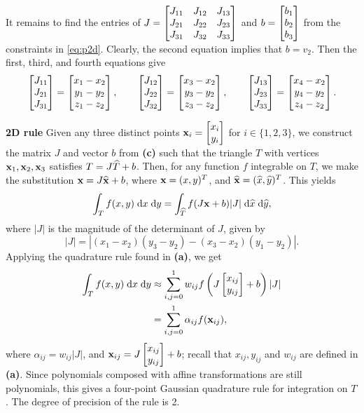 \documentclass{homework}
\begin{document}
\begin{alphaparts}
		It remains to find the entries of $J = \left[\begin{matrix}J_{11} & J_{12} & J_{13} \\ J_{21} & J_{22} & J_{23} \\ J_{31} & J_{32} & J_{33}\end{matrix}\right]$ and $b = \left[\begin{matrix}b_1 \\ b_2 \\ b_3\end{matrix}\right]$ from the constraints in \eqref{eq:p2d}. Clearly, the second equation implies that $b = v_2$. Then the first, third, and fourth equations give
		\begin{equation*}
			\left[\begin{matrix}J_{11} \\ J_{21} \\ J_{31}\end{matrix}\right] = \left[\begin{matrix}x_1 - x_2 \\ y_1-y_2 \\ z_1 - z_2\end{matrix}\right], \qquad \left[\begin{matrix}J_{12} \\ J_{22} \\ J_{32}\end{matrix}\right] = \left[\begin{matrix}x_3 - x_2 \\ y_3 - y_2 \\ z_3 - z_2\end{matrix}\right], \qquad \left[\begin{matrix}J_{13} \\ J_{23} \\ J_{33}\end{matrix}\right] = \left[\begin{matrix}x_4 - x_2 \\ y_4 - y_2 \\ z_4-z_2\end{matrix}\right].
		\end{equation*}
		
		\newcommand{\zh}{\widehat{z}}
		\newcommand{\yb}{\mathbf{y}}
		\questionpart \textbf{2D rule}\; Given any three distinct points $\mathbf{x}_i=\left[\begin{matrix}x_i\\y_i\end{matrix}\right]$ for $i\in\{1,2,3\}$, we construct the matrix $J$ and vector $b$ from \textbf{(c)} such that the triangle $T$ with vertices $\mathbf{x}_1,\mathbf{x}_2,\mathbf{x}_3$ satisfies $T = J\widehat{T} + b$. Then, for any function $f$ integrable on $T$, we make the substitution $\mathbf{x} = J\widehat{\mathbf{x}} +b$, where $\mathbf{x} = (x,y)^T$, and $\widehat{\mathbf{x}} =(\widehat{x}, \widehat{y})^T$. This yields
		\begin{equation*}
			\int_T f(x,y)\;\text{d} x\;\text{d} y = \int_{\widehat{T}}f(J\mathbf{x}+b)|J|\;\text{d} \widehat{x}\;\text{d}\widehat{y},
		\end{equation*}
		where $|J|$ is the magnitude of the determinant of $J$, given by
		\begin{equation*}
			|J| = |(x_1-x_2)(y_3-y_2) - (x_3-x_2)(y_1-y_2)|.
		\end{equation*}
		Applying the quadrature rule found in \textbf{(a)}, we get
		\begin{align*}
			\int_Tf(x,y)\;\text{d} x\;\text{d} y &\approx \sum_{i,j=0}^1 w_{ij}f\left(J\left[\begin{matrix}x_{ij} \\y_{ij}\end{matrix}\right] + b\right)|J| \\
			&=\sum_{i,j=0}^1\alpha_{ij}f(\mathbf{x}_{ij}),
		\end{align*}
		where $\alpha_{ij} = w_{ij}|J|$, and $\mathbf{x}_{ij} = J\left[\begin{matrix}x_{ij} \\ y_{ij}\end{matrix}\right] + b$; recall that $x_{ij}, y_{ij}$ and $w_{ij}$ are defined in \textbf{(a)}. Since polynomials composed with affine transformations are still polynomials, this gives a four-point Gaussian quadrature rule for integration on $T$. The degree of precision of the rule is 2. \\
		

\end{alphaparts}
\end{document}
